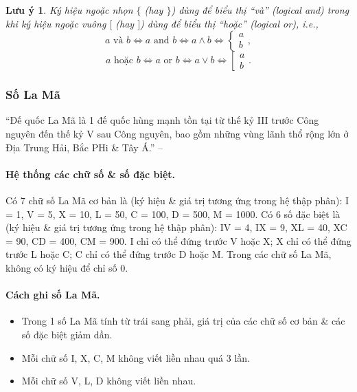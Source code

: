 \documentclass{article}
\numberwithin{equation}{section}
\newtheorem{remark}{Lưu ý}[section]
\begin{document}
\begin{remark}
	Ký hiệu ngoặc nhọn $\{$ (hay $\}$) dùng để biểu thị ``và'' (logical and) trong khi ký hiệu ngoặc vuông $[$ (hay $]$) dùng để biểu thị ``hoặc'' (logical or), i.e.,
	\begin{equation*}
		a\mbox{ và } b\Leftrightarrow a\mbox{ and } b\Leftrightarrow a\land b\Leftrightarrow\left\{\begin{split}
			a\\b
		\end{split}\right.,	
	\end{equation*}
	\begin{equation*}
		a\mbox{ hoặc } b\Leftrightarrow a\mbox{ or } b\Leftrightarrow a\lor b\Leftrightarrow\left[\begin{split}
			a\\b
		\end{split}\right..
	\end{equation*}
\end{remark}

\subsubsection{Số La Mã}
``Đế quốc La Mã là 1 đế quốc hùng mạnh tồn tại từ thế kỷ III trước Công nguyên đến thế kỷ V sau Công nguyên, bao gồm những vùng lãnh thổ rộng lớn ở Địa Trung Hải, Bắc PHi \& Tây Á.'' -- \cite[p. 14]{Toan6}

\paragraph{Hệ thống các chữ số \& số đặc biệt.} Có 7 chữ số La Mã cơ bản là (ký hiệu \& giá trị tương ứng trong hệ thập phân): I = 1, V = 5, X = 10, L = 50, C = 100, D = 500, M = 1000. Có 6 số đặc biệt là (ký hiệu \& giá trị tương ứng trong hệ thập phân): IV = 4, IX = 9, XL = 40, XC = 90, CD = 400, CM = 900. I chỉ có thể đứng trước V hoặc X; X chỉ có thể đứng trước L hoặc C; C chỉ có thể đứng trước D hoặc M. Trong các chữ số La Mã, không có ký hiệu để chỉ số 0.

\paragraph{Cách ghi số La Mã.}
\begin{itemize}
	\item Trong 1 số La Mã tính từ trái sang phải, giá trị của các chữ số cơ bản \& các số đặc biệt giảm dần.
	\item Mỗi chữ số I, X, C, M không viết liền nhau quá 3 lần.
	\item Mỗi chữ số V, L, D không viết liền nhau.
\end{itemize}
\end{document}
